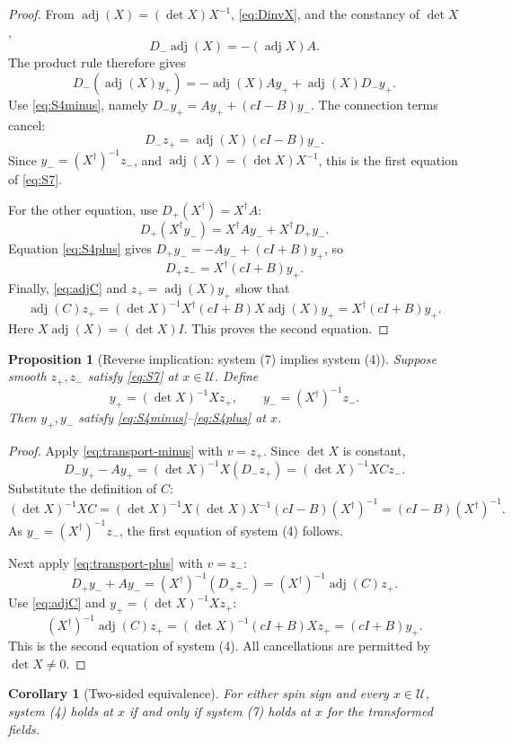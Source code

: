 \documentclass[11pt,a4paper]{article}
\numberwithin{equation}{section}
\newtheorem{proposition}[theorem]{Proposition}
\newtheorem{corollary}[theorem]{Corollary}
\theoremstyle{definition}
\theoremstyle{remark}
\newcommand{\adj}{\operatorname{adj}}
\newcommand{\Uext}{\mathcal U}
\begin{document}
\begin{proof}
From \(\adj(X)=(\det X)X^{-1}\), \eqref{eq:DinvX}, and the constancy
of \(\det X\),
\[
 D_-\adj(X)=-(\adj X)A.
\]
The product rule therefore gives
\[
 D_-(\adj(X)y_+)
 =-\adj(X)Ay_++\adj(X)D_-y_+.
\]
Use \eqref{eq:S4minus}, namely
\(D_-y_+=Ay_++(cI-B)y_-\).  The connection terms cancel:
\[
 D_-z_+=\adj(X)(cI-B)y_-.
\]
Since \(y_-=(X^\dagger)^{-1}z_-\), and \(\adj(X)=(\det X)X^{-1}\),
this is the first equation of \eqref{eq:S7}.

For the other equation, use \(D_+(X^\dagger)=X^\dagger A\):
\[
 D_+(X^\dagger y_-)
 =X^\dagger Ay_-+X^\dagger D_+y_-.
\]
Equation \eqref{eq:S4plus} gives
\(D_+y_-=-Ay_-+(cI+B)y_+\), so
\[
 D_+z_-=X^\dagger(cI+B)y_+.
\]
Finally, \eqref{eq:adjC} and \(z_+=\adj(X)y_+\) show that
\[
 \adj(C)z_+
 =(\det X)^{-1}X^\dagger(cI+B)X\adj(X)y_+
 =X^\dagger(cI+B)y_+.
\]
Here \(X\adj(X)=(\det X)I\).  This proves the second equation.
\end{proof}

\begin{proposition}[Reverse implication: system (7) implies system (4)]
\label{prop:reverse}
Suppose smooth \(z_+,z_-\) satisfy \eqref{eq:S7} at \(x\in\Uext\).  Define
\begin{equation}
 y_+=(\det X)^{-1}Xz_+,\qquad
 y_-=(X^\dagger)^{-1}z_-.
\label{eq:inverse-z}
\end{equation}
Then \(y_+,y_-\) satisfy \eqref{eq:S4minus}--\eqref{eq:S4plus} at \(x\).
\end{proposition}

\begin{proof}
Apply \eqref{eq:transport-minus} with \(v=z_+\).  Since \(\det X\) is
constant,
\[
 D_-y_+-Ay_+
 =(\det X)^{-1}X(D_-z_+)
 =(\det X)^{-1}XCz_-.
\]
Substitute the definition of \(C\):
\[
 (\det X)^{-1}XC
 =(\det X)^{-1}X(\det X)X^{-1}(cI-B)(X^\dagger)^{-1}
 =(cI-B)(X^\dagger)^{-1}.
\]
As \(y_-=(X^\dagger)^{-1}z_-\), the first equation of system (4)
follows.

Next apply \eqref{eq:transport-plus} with \(v=z_-\):
\[
 D_+y_-+Ay_-=(X^\dagger)^{-1}(D_+z_-)
 =(X^\dagger)^{-1}\adj(C)z_+.
\]
Use \eqref{eq:adjC} and \(y_+=(\det X)^{-1}Xz_+\):
\[
 (X^\dagger)^{-1}\adj(C)z_+
 =(\det X)^{-1}(cI+B)Xz_+
 =(cI+B)y_+.
\]
This is the second equation of system (4).  All cancellations are
permitted by \(\det X\neq0\).
\end{proof}

\begin{corollary}[Two-sided equivalence]
\label{cor:47}
For either spin sign and every \(x\in\Uext\), system (4) holds at \(x\)
if and only if system (7) holds at \(x\) for the transformed fields.
\end{corollary}
\end{document}
